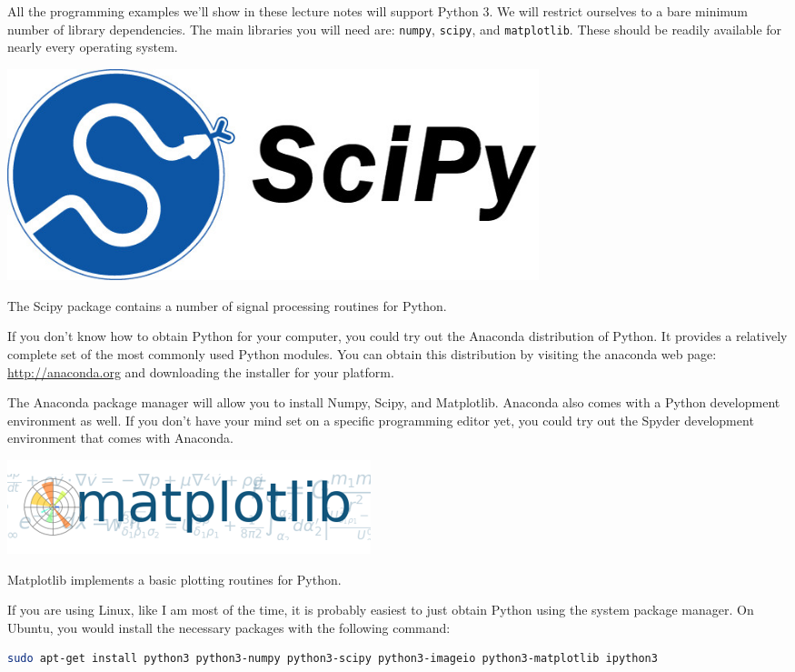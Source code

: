 All the programming examples we'll show in these lecture notes will
support Python 3. We will restrict ourselves to a bare minimum number
of library dependencies. The main libraries you will need are:
\verb|numpy|, \verb|scipy|, and \verb|matplotlib|. These should be
readily available for nearly every operating system.

\begin{marginfigure}
\begin{center}
\includegraphics[width=0.68\textwidth]{ch02/figures/scipy.jpg}
\end{center}
\caption{The Scipy package contains a number of signal processing routines for Python.}
\end{marginfigure}

If you don't know how to obtain Python for your computer, you could
try out the Anaconda distribution of Python. It provides a relatively
complete set of the most commonly used Python modules. You can obtain
this distribution by visiting the anaconda web page:
\url{http://anaconda.org} and downloading the installer for your
platform.

The Anaconda package manager will allow you to install Numpy, Scipy,
and Matplotlib. Anaconda also comes with a Python development
environment as well. If you don't have your mind set on a specific
programming editor yet, you could try out the Spyder development
environment that comes with Anaconda.

\begin{marginfigure}
\includegraphics[width=\textwidth]{ch02/figures/matplotlib.png}
\caption{Matplotlib implements a basic plotting routines for Python.}
\end{marginfigure}

If you are using Linux, like I am most of the time, it is
probably easiest to just obtain Python using the system package
manager. On Ubuntu, you would install the necessary packages with the following command:
\begin{lstlisting}[language=sh,caption=Installing Python on Ubuntu Linux,label=lst:linuxinstall]
sudo apt-get install python3 python3-numpy python3-scipy python3-imageio python3-matplotlib ipython3
\end{lstlisting}

